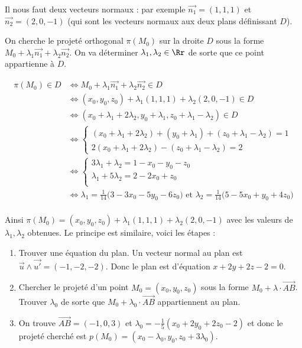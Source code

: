 {\begin{enumerate}
{Il nous faut deux vecteurs normaux : par exemple $\vec{n_1}=(1,1,1)$
et $\vec{n_2}=(2,0,-1)$ (qui sont les vecteurs normaux aux deux plans définissant $D$).

On cherche le projeté orthogonal $\pi(M_0)$ sur la droite $D$ sous la forme
$M_0+\lambda_1 \vec{n_1}+\lambda_2\vec{n_2}$. On va déterminer $\lambda_1,\lambda_2 \in \Rr$ de sorte que ce point
appartienne à $D$.

\begin{align*}
\pi(M_0)\in D
& \iff M_0 + \lambda_1 \vec{n_1}+\lambda_2\vec{n_2}\in D \\
& \iff (x_0,y_0,z_0)+ \lambda_1 (1, 1, 1) +\lambda_2(2,0,-1) \in D  \\
& \iff (x_0+\lambda_1+2\lambda_2, y_0+\lambda_1,z_0+\lambda_1-\lambda_2) \in D \\
& \iff 
\left\{\begin{array}{l}
(x_0+\lambda_1+2\lambda_2)+(y_0+\lambda_1)+(z_0+\lambda_1-\lambda_2)=1 \\
2(x_0+\lambda_1+2\lambda_2)-(z_0+\lambda_1-\lambda_2)=2 \end{array}\right. \\
& \iff 
\left\{\begin{array}{l}
3\lambda_1+\lambda_2=1-x_0-y_0-z_0 \\
\lambda_1+5\lambda_2=2-2x_0+z_0 \\
\end{array}\right. \\
& \iff 
\lambda_1 = \frac{1}{14}\big(3-3x_0-5y_0-6z_0\big)\text{ et } \lambda_2 = \frac{1}{14}\big(5-5x_0+y_0+4z_0\big) \\
\end{align*}

Ainsi $\pi(M_0)= (x_0,y_0,z_0)+ \lambda_1 (1, 1, 1) +\lambda_2(2,0,-1)$
avec les valeurs de $\lambda_1,\lambda_2$ obtenues.
Le principe est similaire, voici les étapes :
  \begin{enumerate}
\item Trouver une équation du plan. Un vecteur normal au plan est $\vec u \wedge \vec{u'}=(-1,-2,-2)$.
Donc le plan est d'équation $x+2y+2z-2=0$.
\item Chercher le projeté d'un point $M_0=(x_0,y_0,z_0)$ sous la forme 
$M_0+\lambda \cdot \overrightarrow{AB}$. Trouver $\lambda_0$ de sorte que $M_0+\lambda_0 \cdot \overrightarrow{AB}$
appartiennent au plan.
\item On trouve $\overrightarrow{AB}=(-1,0,3)$ et $\lambda_0=-\frac15(x_0+2y_0+2z_0-2)$
et donc le projeté cherché est $p(M_0)=(x_0-\lambda_0,y_0,z_0+3\lambda_0)$.
\end{enumerate}
}
\end{enumerate}
}
